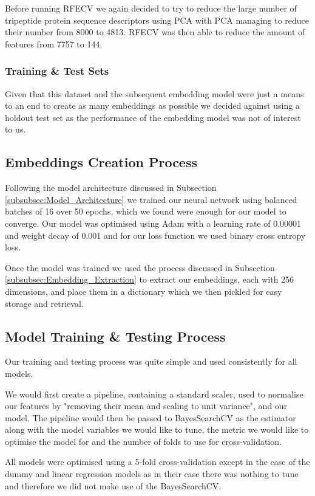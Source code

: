 Before running RFECV we again decided to try to reduce the large number of tripeptide protein sequence descriptors using PCA with PCA managing to reduce their number from 8000 to 4813. RFECV was then able to reduce the amount of features from 7757 to 144.

\subsubsection{Training \& Test Sets}

Given that this dataset and the subsequent embedding model were just a means to an end to create as many embeddings as possible we decided against using a holdout test set as the performance of the embedding model was not of interest to us.

\subsection{Embeddings Creation Process}

Following the model architecture discussed in Subsection \ref{subsubsec:Model_Architecture} we trained our neural network using balanced batches of 16 over 50 epochs, which we found were enough for our model to converge. Our model was optimised using Adam with a learning rate of 0.00001 and weight decay of 0.001 and for our loss function we used binary cross entropy loss.

Once the model was trained we used the process discussed in Subsection \ref{subsubsec:Embedding_Extraction} to extract our embeddings, each with 256 dimensions, and place them in a dictionary which we then pickled for easy storage and retrieval.

\subsection{Model Training \& Testing Process}

Our training and testing process was quite simple and used consistently for all models. 

We would first create a pipeline, containing a standard scaler, used to normalise our features by "removing their mean and scaling to unit variance", and our model. The pipeline would then be passed to BayesSearchCV as the estimator along with the model variables we would like to tune, the metric we would like to optimise the model for and the number of folds to use for cross-validation.

All models were optimised using a 5-fold cross-validation except in the case of the dummy and linear regression models as in their case there was nothing to tune and therefore we did not make use of the BayesSearchCV.

